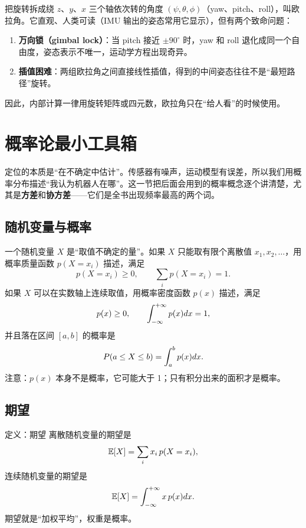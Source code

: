 把旋转拆成绕 $z$、$y$、$x$ 三个轴依次转的角度 $(\psi,\theta,\phi)$（yaw、pitch、roll），叫欧拉角。它直观、人类可读（IMU 输出的姿态常用它显示），但有两个致命问题：

\begin{enumerate}
  \item \textbf{万向锁（gimbal lock）}：当 pitch 接近 $\pm90^\circ$ 时，yaw 和 roll 退化成同一个自由度，姿态表示不唯一，运动学方程出现奇异。
  \item \textbf{插值困难}：两组欧拉角之间直接线性插值，得到的中间姿态往往不是“最短路径”旋转。
\end{enumerate}

因此，内部计算一律用旋转矩阵或四元数，欧拉角只在“给人看”的时候使用。

\section{概率论最小工具箱}\label{sec:02-prob}

定位的本质是“在不确定中估计”。传感器有噪声，运动模型有误差，所以我们用概率分布描述“我认为机器人在哪”。这一节把后面会用到的概率概念逐个讲清楚，尤其是\textbf{方差}和\textbf{协方差}——它们是全书出现频率最高的两个词。

\subsection{随机变量与概率}

一个随机变量 $X$ 是“取值不确定的量”。如果 $X$ 只能取有限个离散值 $x_1,x_2,\dots$，用概率质量函数 $p(X=x_i)$ 描述，满足
\begin{equation}
p(X=x_i)\ge 0,\qquad \sum_i p(X=x_i)=1.
\end{equation}
如果 $X$ 可以在实数轴上连续取值，用概率密度函数 $p(x)$ 描述，满足
\begin{equation}
p(x)\ge 0,\qquad \int_{-\infty}^{+\infty}p(x)d x=1,
\end{equation}
并且落在区间 $[a,b]$ 的概率是
\begin{equation}
P(a\le X\le b)=\int_a^b p(x)d x.
\end{equation}
注意：$p(x)$ 本身不是概率，它可能大于 1；只有积分出来的面积才是概率。

\subsection{期望}

\begin{keybox}{定义：期望}
离散随机变量的期望是
\begin{equation}
\mathbb{E}[X]=\sum_i x_i\,p(X=x_i),
\end{equation}
连续随机变量的期望是
\begin{equation}
\mathbb{E}[X]=\int_{-\infty}^{+\infty}x\,p(x)d x.
\label{eq:02-expect}
\end{equation}
期望就是“加权平均”，权重是概率。
\end{keybox}

